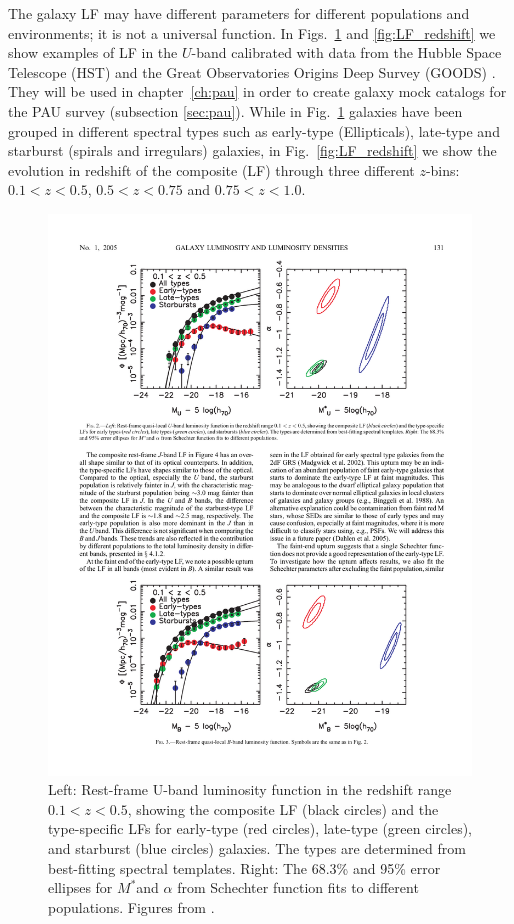 The galaxy LF may have different parameters for different populations and environments; it is not a universal function. In Figs.~\ref{fig:LF_type} and \ref{fig:LF_redshift} we show examples of LF in the $U$-band calibrated with data from the Hubble Space Telescope (HST) and the Great Observatories Origins Deep Survey (GOODS) \citep{Dahlen2005}. They will be used in chapter~\ref{ch:pau} in order to create galaxy mock catalogs for the PAU survey (subsection \ref{sec:pau}). While in Fig.~\ref{fig:LF_type} galaxies have been grouped in different spectral types such as early-type (Ellipticals), late-type and starburst (spirals and irregulars) galaxies, in Fig.~\ref{fig:LF_redshift} we show the evolution in redshift of the composite (LF) through three different $z$-bins: $0.1<z<0.5$, $0.5<z<0.75$ and $0.75<z<1.0$.
\begin{figure}
\centering
\includegraphics[width=130mm]{./plots/LF_type.pdf}
\caption{Left: Rest-frame U-band luminosity function in the redshift range $0.1<z<0.5$, showing the composite LF (black circles) and the type-specific LFs for early-type (red circles), late-type (green circles), and starburst (blue circles) galaxies. The types are determined from best-fitting spectral templates. Right: The 68.3\% and 95\% error ellipses for $M^*$and $\alpha$ from Schechter function fits to different populations. Figures from \citet{Dahlen2005}.}
\label{fig:LF_type}
\end{figure}

